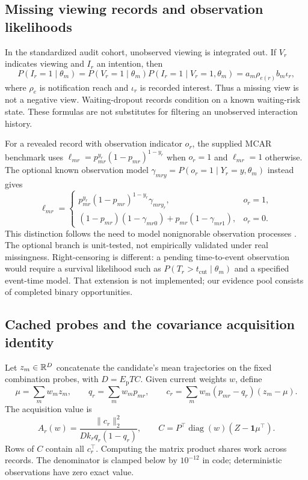 \subsection{Missing viewing records and observation likelihoods}
In the standardized audit cohort, unobserved viewing is integrated out. If $V_r$ indicates viewing and $I_r$ an intention, then
\begin{equation}
 P(I_r=1\mid\theta_m)=P(V_r=1\mid\theta_m)P(I_r=1\mid V_r=1,\theta_m)
 =a_m\rho_{e(r)}b_m\iota_r,
 \label{eq:view}
\end{equation}
where $\rho_e$ is notification reach and $\iota_r$ is recorded interest. Thus a missing view is not a negative view. Waiting-dropout records condition on a known waiting-risk state. These formulas are not substitutes for filtering an unobserved interaction history.

For a revealed record with observation indicator $o_r$, the supplied MCAR benchmark uses $\ell_{mr}=p_{mr}^{y_r}(1-p_{mr})^{1-y_r}$ when $o_r=1$ and $\ell_{mr}=1$ otherwise. The optional known observation model $\gamma_{mry}=P(o_r=1\mid Y_r=y,\theta_m)$ instead gives
\begin{equation}
 \ell_{mr}=\begin{cases}
 p_{mr}^{y_r}(1-p_{mr})^{1-y_r}\gamma_{mr y_r},&o_r=1,\\
 (1-p_{mr})(1-\gamma_{mr0})+p_{mr}(1-\gamma_{mr1}),&o_r=0.
 \end{cases}
 \label{eq:missing}
\end{equation}
This distinction follows the need to model nonignorable observation processes \citep{rubin1976}. The optional branch is unit-tested, not empirically validated under real missingness. Right-censoring is different: a pending time-to-event observation would require a survival likelihood such as $P(T_r>t_{\mathrm{cut}}\mid\theta_m)$ and a specified event-time model. That extension is not implemented; our evidence pool consists of completed binary opportunities.

\subsection{Cached probes and the covariance acquisition identity}
Let $z_m\in\mathbb{R}^D$ concatenate the candidate's mean trajectories on the fixed combination probes, with $D=E_{\mathrm p}TC$. Given current weights $w$, define
\begin{equation}
 \mu=\sum_mw_mz_m,\qquad q_r=\sum_mw_mp_{mr},\qquad
 c_r=\sum_mw_m(p_{mr}-q_r)(z_m-\mu).
 \label{eq:cov}
\end{equation}
The acquisition value is
\begin{equation}
 A_r(w)=\frac{\|c_r\|_2^2}{Dk_rq_r(1-q_r)},\qquad
 C=P^\top\operatorname{diag}(w)(Z-\mathbf1\mu^\top).
 \label{eq:score}
\end{equation}
Rows of $C$ contain all $c_r^\top$. Computing the matrix product shares work across records. The denominator is clamped below by $10^{-12}$ in code; deterministic observations have zero exact value.

